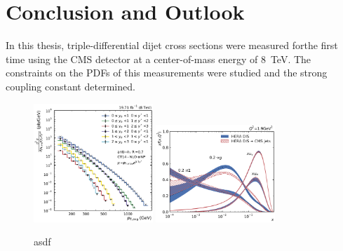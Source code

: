 
\chapter{Conclusion and Outlook}

In this thesis, triple-differential dijet cross sections were measured forthe
first time using the CMS detector at a center-of-mass energy of \SI{8}{\TeV}.
The constraints on the PDFs of this measurements were studied and the strong
coupling constant \asmz determined.


\begin{figure}[h!tbp]
    \centering
    \includegraphics[width=0.4\textwidth]{figures/measurement/ptavg_spectrum.pdf}\hfill
    \includegraphics[width=0.4\textwidth]{figures/pdf_constraints/pdfcomp_direct_overview_1.9.pdf}
    \caption[asdf]{asdf}
    \label{fig:conclusion}
\end{figure}
